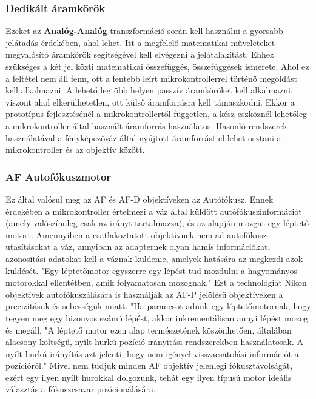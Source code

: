 \subsubsection{Dedikált áramkörök}
Ezeket az \textbf{Analóg-Analóg} transzformáció során kell használni a gyorsabb jelátadás érdekében, ahol lehet. Itt a megfelelő matematikai műveleteket megvalósító áramkörök segítségével kell elvégezni a jelátalakítást. Ehhez szükséges a két jel közti matematikai összefüggés, összefüggések ismerete. Ahol ez a feltétel nem áll fenn, ott a fentebb leírt mikrokontrollerrel történő megoldást kell alkalmazni. A lehető legtöbb helyen passzív áramköröket kell alkalmazni, viszont ahol elkerülhetetlen, ott külső áramforrásra kell támaszkodni. Ekkor a prototípus fejlesztésénél a mikrokontrollertől független, a kész eszköznél lehetőleg a mikrokontroller által használt áramforrás használatos. Hasonló rendszerek használatával a fényképezőváz által nyújtott áramforrást el lehet osztani a mikrokontroller és az objektív között.

\subsubsection{AF Autofókuszmotor}
Ez által valósul meg az AF és AF-D objektíveken az Autófókusz. Ennek érdekében a mikrokontroller értelmezi a váz által küldött autófókuszinformációt (amely valószínüleg csak az irányt tartalmazza), és az alapján mozgat egy léptető motort. Amennyiben a csatlakoztatott objektívnek nem ad autofókusz utasításokat a váz, annyiban az adapternek olyan hamis információkat, azonosítási adatokat kell a váznak küldenie, amelyek hatására az megkezdi azok küldését. "Egy léptetőmotor egyszerre egy lépést tud mozdulni a hagyományos motorokkal ellentétben, amik folyamatosan mozognak."\cite{parmar2017design} Ezt a technológiát Nikon objektívek autofókuszálására is használják az AF-P jelölésű objektíveken \cite{Nikon_AF} a precizitásuk és sebességük miatt. "Ha parancsot adunk egy léptetőmotornak, hogy tegyen meg egy bizonyos számú lépést, akkor inkrementálisan annyi lépést mozog és megáll. "A léptető motor ezen alap természetének köszönhetően, általában alacsony költségű, nyílt hurkú pozíció irányitási rendszerekben használatosak. A nyílt hurkú irányítás azt jelenti, hogy nem igényel visszacsatolási információt a pozícióról." \cite{parmar2017design} Mivel nem tudjuk minden AF objektív jelenlegi fókusztávolságát\cite{Nikon_AF}, ezért egy ilyen nyílt hurokkal dolgozunk, tehát egy ilyen típusú motor ideális választás a fókuszcsavar pozícionálására.
